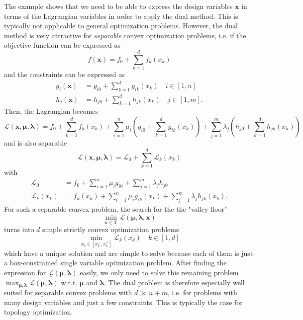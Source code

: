 The example shows that we need to be able to express the design variables $\mathbf{x}$ in terms of the Lagrangian variables in order to apply the dual method. This is typically not applicable to general optimization problems. However, the dual method is very attractive for \emph{separable} convex optimization problems, i.e. if the objective function can be expressed as 
\begin{equation}
    f(\mathbf{x}) = f_0 + \sum_{k=1}^d f_k(x_k)
\end{equation}
and the constraints can be expressed as 
\begin{align}
    g_i(\mathbf{x}) & = g_{i0} + \sum_{k=1}^d g_{ik}(x_k) \quad i \in [1,n]\\
    h_j(\mathbf{x}) & = h_{j0} + \sum_{k=1}^d h_{jk}(x_k) \quad j \in [1,m].
\end{align}
Then, the Lagrangian becomes 
\begin{equation}
    \mathcal{L} (\mathbf{x}, \pmb{\mu}, \pmb{\lambda}) = f_0 + \sum_{k=1}^d f_k(x_k) + \sum_{i=1}^n \mu_i \left(g_{i0} + \sum_{k=1}^d g_{ik}(x_k) \right) + \sum_{j=1}^m \lambda_j  \left(h_{j0} + \sum_{k=1}^d h_{jk}(x_k) \right)
\end{equation}
and is also separable
\begin{equation}
    \mathcal{L} (\mathbf{x}, \pmb{\mu}, \pmb{\lambda}) = \mathcal{L}_0 + \sum_{k=1}^d \mathcal{L}_k(x_k)
\end{equation}
with 
\begin{align}
    \mathcal{L}_0 &= f_0 + \sum_{i=1}^n \mu_i g_{i0} + \sum_{j=1}^m \lambda_j  h_{j0} \\
    \mathcal{L}_k (x_k) & = f_k(x_k) + \sum_{i=1}^n \mu_i g_{ik}(x_k) + \sum_{j=1}^m \lambda_j  h_{jk}(x_k). 
\end{align}
For such a separable convex problem, the search for the the "valley floor" 
\begin{equation}
    \min_{\mathbf{x}\in \mathcal{X}} \mathcal{L}(\pmb{\mu}, \pmb{\lambda}, \mathbf{x})
\end{equation} 
turns into $d$ simple strictly convex optimization problems 
\begin{equation}
    \min_{x_k \in [x_k^-, x_k^+]} \mathcal{L}_k(x_k) \quad k \in[1,d]
\end{equation}
which have a unique solution and are simple to solve because each of them is just a box-constrained single variable optimization problem. 
After finding the expression for $\underline{\mathcal{L}} (\pmb{\mu}, \pmb{\lambda})$ easily, we only need to solve this remaining problem $\max_{\pmb{\mu}, \pmb{\lambda}} \underline{\mathcal{L}} (\pmb{\mu}, \pmb{\lambda})$ w.r.t. $\pmb{\mu}$ and $\pmb{\lambda}$. The dual problem is therefore especially well suited for separable convex problems with $d \gg n+m$, i.e. for problems with many design variables and just a few constraints. This is typically the case for topology optimization.

